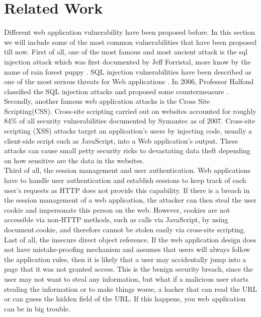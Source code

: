 \documentclass[12pt, a4paper]{article}
\begin{document}
%


\section{Related Work}
Different web application vulnerability have been proposed before. In this section we will include some of the most common 
vulnerabilities that have been proposed till now. First of all, one of the most famous and most ancient attack is the sql injection 
attack which was first documented by Jeff Forristal, more know by the name of rain forest puppy \cite{Jeff}. 
 SQL injection vulnerabilities have been described as one of the most serious threats for Web applications \cite{Aucsmith} \cite{TO}. 
 In 2006, Professor Halfond classified the SQL injection attacks and proposed some countermeasure \cite{halfond06mar}.\\

Secondly, another famous web application attacks is the Cross Site Scripting(CSS). 
Cross-site scripting carried out on websites accounted for roughly 84\% of all security vulnerabilities documented by Symantec as of 2007\cite{symantec}. 
Cross-site scripting (XSS) attacks target an application's users by injecting code, usually a client-side script such as JavaScript, into a Web application's output. 
These attacks can cause small petty security ricks to devastating data theft depending on how sensitive are the data in the websites.\\

Third of all, the session management and user authentication. Web applications have to handle user authentication and establish sessions to keep track 
of each user's requests as HTTP does not provide this capability. If there is a breach in the session management of 
a web application, the attacker can then steal the user cookie and impersonate this person on the web. 
However, cookies are not accessible via non-HTTP methods, such as calls via JavaScript, by using document.cookie, and therefore cannot be stolen easily via cross-site scripting\cite{symantec}.\\

Last of all, the insecure direct object reference. If the web application design does not have mistake-proofing mechanism and assumes that users will always follow the application rules, 
then it is likely that a user may accidentally jump into a page that it was not granted access. This is the benign security breach, since the user may not want to steal any information, 
but what if a malicious user starts stealing the information or to make things worse, a hacker that can read the URL or can guess the hidden field of the URL\cite{Michael}. 
If this happens, you web application can be in big trouble.
\end{document}
